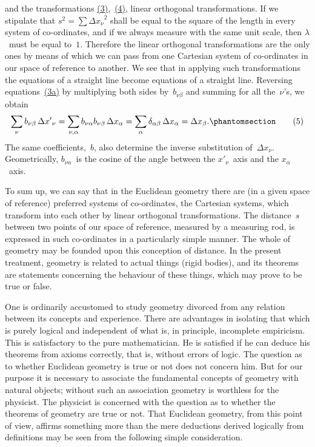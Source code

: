 \documentclass[12pt]{book}[2005/09/16]
\newcommand{\Change}[2]{#2}
\newcommand{\Add}[1]{\Change{}{#1}}
\newcommand{\PageSep}[1]{\ignorespaces}
\newcommand{\Tag}[1]{%
  \phantomsection
  \label{eqn:#1}
  \tag*{#1}
}
\newcommand{\Eqref}[1]{\hyperref[eqn:#1]{#1}}
\begin{document}
%
%
%
%
%
and the transformations \Eqref{(3)},~\Eqref{(4)}, linear orthogonal
transformations. If we stipulate that $s^{2} = \sum {\Delta x_{\nu}}^{2}$ shall be
equal to the square of the length in every system of
co-ordinates, and if we always measure with the same unit
scale, then $\lambda$~must be equal to~$1$. Therefore the linear
orthogonal transformations are the only ones by means of
which we can pass from one Cartesian system of co-ordinates
in our space of reference to another. We see
\PageSep{8}
that in applying such transformations the equations of
a straight line become equations of a straight line.
Reversing equations~\Eqref{(3a)} by multiplying both sides by~$b_{\nu\beta}$
and summing for all the~$\nu$'s, we obtain
\[
\Change{\sum}{\sum_{\nu}} b_{\nu\beta}\, {\Delta x'}_{\nu}
  = \sum_{\nu, \alpha} b_{\nu\alpha} b_{\nu\beta}\, \Delta x_{\alpha}
  = \sum_{\alpha} \delta_{\alpha\beta}\, \Delta x_{\alpha}
  = \Delta x_{\beta}\Add{.}
\Tag{(5)}
\]
The same coefficients,~$b$, also determine the inverse
substitution of~$\Delta x_{\nu}$. Geometrically, $b_{\nu\alpha}$~is the cosine of the
angle between the ${x'}_{\nu}$~axis and the $x_{\alpha}$~axis.

To sum up, we can say that in the Euclidean geometry
%
%
%
there are (in a given space of reference) preferred systems
of co-ordinates, the Cartesian systems, which transform
into each other by linear orthogonal transformations.
The distance~$s$ between two points of our space of
reference, measured by a measuring rod, is expressed in
such co-ordinates in a particularly simple manner. The
whole of geometry may be founded upon this conception
of distance. In the present treatment, geometry is
related to actual things (rigid bodies), and its theorems
are statements concerning the behaviour of these things,
which may prove to be true or false.

One is ordinarily accustomed to study geometry
divorced from any relation between its concepts and
experience. There are advantages in isolating that
which is purely logical and independent of what is, in
principle, incomplete empiricism. This is satisfactory to
the pure mathematician. He is satisfied if he can deduce
his theorems from axioms correctly, that is, without
errors of logic. The question as to whether Euclidean
\PageSep{9}
geometry is true or not does not concern him. But for
our purpose it is necessary to associate the fundamental
concepts of geometry with natural objects; without such
an association geometry is worthless for the physicist.
The physicist is concerned with the question as to
whether the theorems of geometry are true or not. That
Euclidean geometry, from this point of view, affirms
something more than the mere deductions derived
logically from definitions may be seen from the following
simple consideration.
\end{document}
